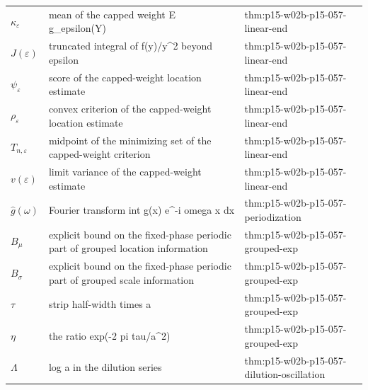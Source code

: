 \begin{longtable}{@{}p{}p{}p{}@{}}
\(\kappa_\varepsilon\) & mean of the capped weight E g\_epsilon(Y) & thm:\allowbreak{}p15-\allowbreak{}w02b-\allowbreak{}p15-\allowbreak{}057-\allowbreak{}linear-\allowbreak{}end \\
\(J(\varepsilon)\) & truncated integral of f(y)/y\^{}2 beyond epsilon & thm:\allowbreak{}p15-\allowbreak{}w02b-\allowbreak{}p15-\allowbreak{}057-\allowbreak{}linear-\allowbreak{}end \\
\(\psi_\varepsilon\) & score of the capped-weight location estimate & thm:\allowbreak{}p15-\allowbreak{}w02b-\allowbreak{}p15-\allowbreak{}057-\allowbreak{}linear-\allowbreak{}end \\
\(\rho_\varepsilon\) & convex criterion of the capped-weight location estimate & thm:\allowbreak{}p15-\allowbreak{}w02b-\allowbreak{}p15-\allowbreak{}057-\allowbreak{}linear-\allowbreak{}end \\
\(T_{n,\varepsilon}\) & midpoint of the minimizing set of the capped-weight criterion & thm:\allowbreak{}p15-\allowbreak{}w02b-\allowbreak{}p15-\allowbreak{}057-\allowbreak{}linear-\allowbreak{}end \\
\(v(\varepsilon)\) & limit variance of the capped-weight estimate & thm:\allowbreak{}p15-\allowbreak{}w02b-\allowbreak{}p15-\allowbreak{}057-\allowbreak{}linear-\allowbreak{}end \\
\(\widehat g(\omega)\) & Fourier transform int g(x) e\^{}{-i omega x} dx & thm:\allowbreak{}p15-\allowbreak{}w02b-\allowbreak{}p15-\allowbreak{}057-\allowbreak{}periodization \\
\(B_\mu\) & explicit bound on the fixed-phase periodic part of grouped location information & thm:\allowbreak{}p15-\allowbreak{}w02b-\allowbreak{}p15-\allowbreak{}057-\allowbreak{}grouped-\allowbreak{}exp \\
\(B_\sigma\) & explicit bound on the fixed-phase periodic part of grouped scale information & thm:\allowbreak{}p15-\allowbreak{}w02b-\allowbreak{}p15-\allowbreak{}057-\allowbreak{}grouped-\allowbreak{}exp \\
\(\tau\) & strip half-width times a & thm:\allowbreak{}p15-\allowbreak{}w02b-\allowbreak{}p15-\allowbreak{}057-\allowbreak{}grouped-\allowbreak{}exp \\
\(\eta\) & the ratio exp(-2 pi tau/a\^{}2) & thm:\allowbreak{}p15-\allowbreak{}w02b-\allowbreak{}p15-\allowbreak{}057-\allowbreak{}grouped-\allowbreak{}exp \\
\(\Lambda\) & log a in the dilution series & thm:\allowbreak{}p15-\allowbreak{}w02b-\allowbreak{}p15-\allowbreak{}057-\allowbreak{}dilution-\allowbreak{}oscillation \\

\end{longtable}
